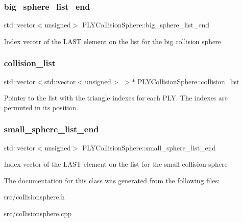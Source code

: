 \subsubsection{\texorpdfstring{big\+\_\+sphere\+\_\+list\+\_\+end}{big\_sphere\_list\_end}}
{\footnotesize\ttfamily std\+::vector$<$unsigned$>$ P\+L\+Y\+Collision\+Sphere\+::big\+\_\+sphere\+\_\+list\+\_\+end}

Index vecotr of the L\+A\+ST element on the list for the big collision sphere \mbox{\label{class_p_l_y_collision_sphere_a6ef04af98385142ed0b41a2e35f423b9}} 
\subsubsection{\texorpdfstring{collision\+\_\+list}{collision\_list}}
{\footnotesize\ttfamily std\+::vector$<$std\+::vector$<$unsigned$>$ $>$$\ast$ P\+L\+Y\+Collision\+Sphere\+::collision\+\_\+list}

Pointer to the list with the triangle indexes for each P\+LY. The indexes are permuted in its position. \mbox{\label{class_p_l_y_collision_sphere_a7fd18a4a8a9dbb2f7104f9b9a5dd6766}} 
\subsubsection{\texorpdfstring{small\+\_\+sphere\+\_\+list\+\_\+end}{small\_sphere\_list\_end}}
{\footnotesize\ttfamily std\+::vector$<$unsigned$>$ P\+L\+Y\+Collision\+Sphere\+::small\+\_\+sphere\+\_\+list\+\_\+end}

Index vector of the L\+A\+ST element on the list for the small collision sphere 

The documentation for this class was generated from the following files\+:\begin{DoxyCompactItemize}
\item 
src/collisionsphere.\+h\item 
src/collisionsphere.\+cpp\end{DoxyCompactItemize}
